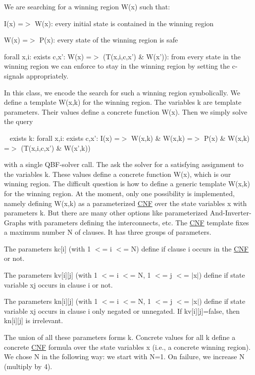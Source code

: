 We are searching for a winning region W(x) such that\-: 
\begin{DoxyEnumerate}
\item I(x) =$>$ W(x)\-: every initial state is contained in the winning region 
\item W(x) =$>$ P(x)\-: every state of the winning region is safe 
\item forall x,i\-: exists c,x'\-: W(x) =$>$ (T(x,i,c,x') \& W(x'))\-: from every state in the winning region we can enforce to stay in the winning region by setting the c-\/signals appropriately. 
\end{DoxyEnumerate}In this class, we encode the search for such a winning region symbolically. We define a template W(x,k) for the winning region. The variables k are template parameters. Their values define a concrete function W(x). Then we simply solve the query \par
 ~ exists k\-: forall x,i\-: exists c,x'\-: I(x) =$>$ W(x,k) \& W(x,k) =$>$ P(x) \& W(x,k) =$>$ (T(x,i,c,x') \& W(x',k)) \par
 with a single Q\-B\-F-\/solver call. The ask the solver for a satisfying assignment to the variables k. These values define a concrete function W(x), which is our winning region. The difficult question is how to define a generic template W(x,k) for the winning region. At the moment, only one possibility is implemented, namely defining W(x,k) as a parameterized \hyperlink{classCNF}{C\-N\-F} over the state variables x with parameters k. But there are many other options like parameterized And-\/\-Inverter-\/\-Graphs with parameters defining the interconnects, etc. The \hyperlink{classCNF}{C\-N\-F} template fixes a maximum number N of clauses. It has three groups of parameters. 
\begin{DoxyItemize}
\item The parameters kc\mbox{[}i\mbox{]} (with 1 $<$= i $<$= N) define if clause i occurs in the \hyperlink{classCNF}{C\-N\-F} or not. 
\item The parameters kv\mbox{[}i\mbox{]}\mbox{[}j\mbox{]} (with 1 $<$= i $<$= N, 1 $<$= j $<$= $|$x$|$) define if state variable xj occurs in clause i or not. 
\item The parameters kn\mbox{[}i\mbox{]}\mbox{[}j\mbox{]} (with 1 $<$= i $<$= N, 1 $<$= j $<$= $|$x$|$) define if state variable xj occurs in clause i only negated or unnegated. If kv\mbox{[}i\mbox{]}\mbox{[}j\mbox{]}=false, then kn\mbox{[}i\mbox{]}\mbox{[}j\mbox{]} is irrelevant. 
\end{DoxyItemize}The union of all these parameters forms k. Concrete values for all k define a concrete \hyperlink{classCNF}{C\-N\-F} formula over the state variables x (i.\-e., a concrete winning region). We chose N in the following way\-: we start with N=1. On failure, we increase N (multiply by 4).


